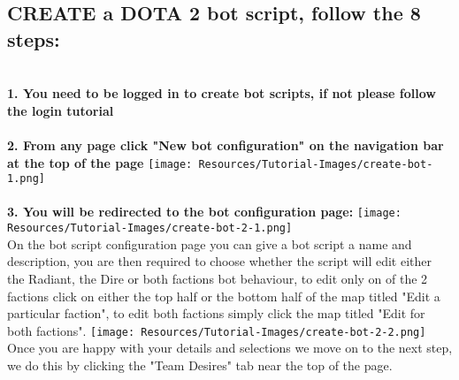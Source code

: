 \documentclass{article}
\begin{document}
\subsection*{CREATE a DOTA 2 bot script, follow the 8 steps:}
\begin{flushleft}
\textbf{\\1. You need to be logged in to create bot scripts, if not please follow the login tutorial}\\

\textbf{\\2. From any page click "New bot configuration" on the navigation bar at the top of the page}
\texttt{[image: Resources/Tutorial-Images/create-bot-1.png]}\\

\textbf{\\3. You will be redirected to the bot configuration page:}
\texttt{[image: Resources/Tutorial-Images/create-bot-2-1.png]}
\\On the bot script configuration page you can give a bot script a name and description, you are then required to choose whether the script will edit either the Radiant, the Dire or both factions bot behaviour, to edit only on of the 2 factions click on either the top half or the bottom half of the map titled "Edit a particular faction", to edit both factions simply click the map titled "Edit for both factions".
\texttt{[image: Resources/Tutorial-Images/create-bot-2-2.png]}
Once you are happy with your details and selections we move on to the next step, we do this by clicking the "Team Desires" tab near the top of the page.


\end{flushleft}
\end{document}
